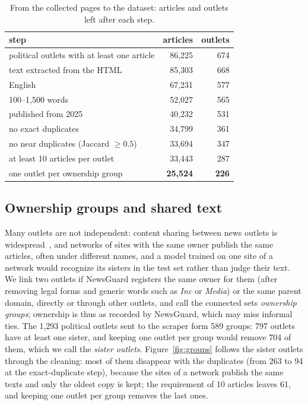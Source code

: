 \documentclass[11pt,a4paper]{article}
\begin{document}
\begin{table}[t]
\centering
\caption{From the collected pages to the dataset: articles and outlets left after each step.}\label{tab:cleaning}
\begin{tabular}{lrr}
\toprule
step & articles & outlets \\
\midrule
political outlets with at least one article & 86,225 & 674 \\
text extracted from the HTML & 85,303 & 668 \\
English & 67,231 & 577 \\
100--1,500 words & 52,027 & 565 \\
published from 2025 & 40,232 & 531 \\
no exact duplicates & 34,799 & 361 \\
no near duplicates (Jaccard $\geq 0.5$) & 33,694 & 347 \\
at least 10 articles per outlet & 33,443 & 287 \\
one outlet per ownership group & \textbf{25,524} & \textbf{226} \\
\bottomrule
\end{tabular}
\end{table}

\subsection{Ownership groups and shared text}\label{sec:groups}
Many outlets are not independent: content sharing between news outlets is widespread~\cite{horne2019spirals}, and
networks of sites with the same owner publish the same articles, often under different names, and a model trained on one site of a network would recognize its sisters in the test set rather
than judge their text. We link two outlets if NewsGuard registers the same owner for them (after removing legal forms
and generic words such as \emph{Inc} or \emph{Media}) or the same parent domain, directly or through other outlets, and
call the connected sets \emph{ownership groups}; ownership is thus as recorded by NewsGuard, which may miss informal
ties. The 1,293 political outlets sent to the scraper form 589 groups: 797 outlets have at least one sister, and
keeping one outlet per group would remove 704 of them, which we call the \emph{sister outlets}.
Figure~\ref{fig:groups} follows the sister outlets through the cleaning: most of them disappear with the duplicates
(from 263 to 94 at the exact-duplicate step), because the sites of a network publish the same texts and only the oldest
copy is kept; the requirement of 10 articles leaves 61, and keeping one outlet per group removes the last ones.
\end{document}
